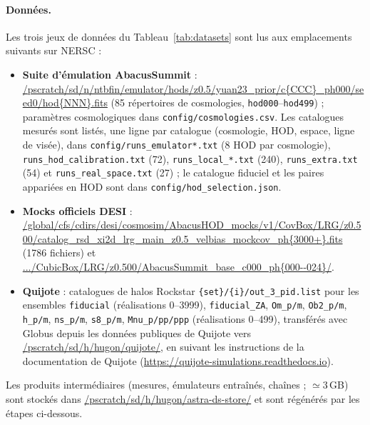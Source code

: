 \paragraph{Données.} Les trois jeux de données du Tableau~\ref{tab:datasets} sont lus aux emplacements suivants sur NERSC :
\begin{itemize}
\item \textbf{Suite d'émulation AbacusSummit} : \url{/pscratch/sd/n/ntbfin/emulator/hods/z0.5/yuan23_prior/c{CCC}_ph000/seed0/hod{NNN}.fits} (85 répertoires de cosmologies, \texttt{hod000}--\texttt{hod499}) ; paramètres cosmologiques dans \texttt{config/cosmologies.csv}. Les catalogues mesurés sont listés, une ligne par catalogue (cosmologie, HOD, espace, ligne de visée), dans \texttt{config/runs\_emulator*.txt} (8 HOD par cosmologie), \texttt{runs\_hod\_calibration.txt} (72), \texttt{runs\_local\_*.txt} (240), \texttt{runs\_extra.txt} (54) et \texttt{runs\_real\_space.txt} (27) ; le catalogue fiduciel et les paires appariées en HOD sont dans \texttt{config/hod\_selection.json}.
\item \textbf{Mocks officiels DESI} : \url{/global/cfs/cdirs/desi/cosmosim/AbacusHOD_mocks/v1/CovBox/LRG/z0.500/catalog_rsd_xi2d_lrg_main_z0.5_velbias_mockcov_ph{3000+}.fits} (1786 fichiers) et \url{.../CubicBox/LRG/z0.500/AbacusSummit_base_c000_ph{000--024}/}.
\item \textbf{Quijote} : catalogues de halos Rockstar \texttt{\{set\}/\{i\}/out\_3\_pid.list} pour les ensembles \texttt{fiducial} (réalisations 0--3999), \texttt{fiducial\_ZA}, \texttt{Om\_p/m}, \texttt{Ob2\_p/m}, \texttt{h\_p/m}, \texttt{ns\_p/m}, \texttt{s8\_p/m}, \texttt{Mnu\_p/pp/ppp} (réalisations 0--499), transférés avec Globus depuis les données publiques de Quijote vers \url{/pscratch/sd/h/hugon/quijote/}, en suivant les instructions de la documentation de Quijote (\url{https://quijote-simulations.readthedocs.io}).
\end{itemize}
Les produits intermédiaires (mesures, émulateurs entraînés, chaînes ; $\simeq3$\,GB) sont stockés dans \url{/pscratch/sd/h/hugon/astra-ds-store/} et sont régénérés par les étapes ci-dessous.

